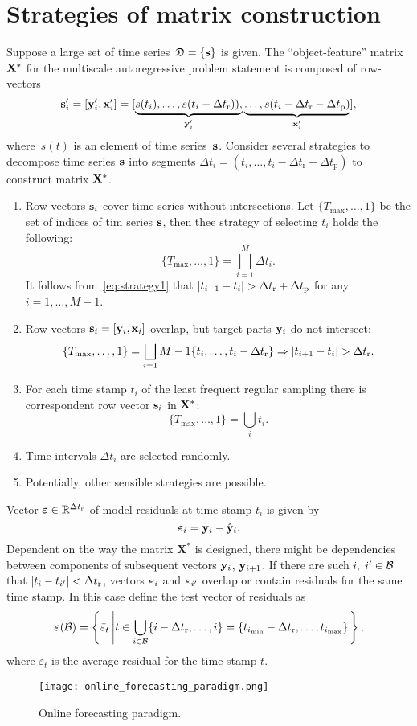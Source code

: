 \documentclass[12pt]{article}
\begin{document}
\section{Strategies of matrix construction}
Suppose a large set of time series~${\mathfrak{D}}=\{{\mathbf{s}}\}$ is given. The ``object-feature'' matrix~${\mathbf{X}}^*$ for the multiscale autoregressive problem statement is composed of row-vectors
\[
{\mathbf{s}}_i^\prime = [{\mathbf{y}}_i^\prime, {\mathbf{x}}_i^\prime] = [\underbrace{s(t_i),\dots,s(t_i-\Delta t_\text{r})),}_{{\mathbf{y}}_i^\prime}
\underbrace{\dots,s(t_i-\Delta t_\text{r}-\Delta t_\text{p})}_{{\mathbf{x}}_i^\prime}],
\]
where~$s(t)$ is an element of time series~${\mathbf{s}}$. Consider several strategies to decompose time series ${\mathbf{s}}$ into segments $\Delta t_i = (t_i,\dots,t_i-\Delta t_\text{r}-\Delta t_\text{p})$ to construct  matrix ${\mathbf{X}}^{*}$.
\begin{enumerate}
\item Row vectors ${\mathbf{s}}_i$ cover time series without intersections. Let $\{T_{\max}, \dots, 1\}$ be the set of indices of tim series ${\mathbf{s}}$, then thee strategy of selecting $t_i$ holds the following:
\begin{equation}\label{eq:strategy1}\{T_{\max}, \dots, 1\} = \bigsqcup_{i=1}^{M} \Delta t_i.\end{equation}
It follows from~\eqref{eq:strategy1} that $|t_{i+1} - t_i| > \Delta t_\text{r} + \Delta t_\text{p}$ for any $i = 1, \dots, M-1$.
\item Row vectors ${\mathbf{s}}_i = [{\mathbf{y}}_i, {\mathbf{x}}_i]$ overlap, but target parts  ${\mathbf{y}}_i$ do not intersect:
    \begin{equation}\label{eq:strategy2}\{T_{\max}, \dots, 1\} = \bigsqcup_{i=1}{M-1} \{t_i,\dots,t_i-\Delta t_\text{r}\} \Rightarrow |t_{i+1} - t_i| > \Delta t_\text{r}. \end{equation}
\item For each time stamp $t_i$ of the least frequent regular sampling there is correspondent row vector ${\mathbf{s}}_i$ in ${\mathbf{X}}^{*}$:
    \[\{T_{\max}, \dots, 1\} = \bigcup_i t_i. \]
\item Time intervals $\Delta t_i$ are selected randomly.
\item Potentially, other sensible strategies are possible.
\end{enumerate}
 Vector ${\boldsymbol{\varepsilon}} \in \mathbb{R}^{\Delta t_\text{r}}$ of model residuals at time stamp $t_i$ is given by
\[{\boldsymbol{\varepsilon}}_i = {{\mathbf{y}}}_i - \hat{{\mathbf{y}}}_i.\]
Dependent on the way the matrix $\mathbf{X}^{*}$ is designed, there might be dependencies between components of subsequent vectors ${\mathbf{y}}_{i}$, ${\mathbf{y}}_{i+1}$.
If there are such $i, \; i' \in {\mathcal{B}}$ that $|t_i - t_{i'}| < \Delta t_\text{r}$, vectors ${\boldsymbol{\varepsilon}}_i$ and ${\boldsymbol{\varepsilon}}_{i'}$ overlap or contain residuals for the same time stamp. In this case define the test vector of residuals as
\[{\boldsymbol{\varepsilon}}({\mathcal{B}}) = \left\{\bar{\varepsilon}_t \left| t \in \bigcup_{i \in {\mathcal{B}}} \{i-\Delta t_\text{r}, \dots, i\} = \{t_{i_{\min}} - \Delta t_\text{r}, \dots, t_{i_{\max}}\}\right.\right\}, \]
where $\bar{\varepsilon}_t$ is the average residual for the time stamp $t$.
\begin{figure}[!ht]
\centering\texttt{[image: online\_forecasting\_paradigm.png]}
\label{fg:online_frc}
\caption{Online forecasting paradigm.}
\end{figure}
\end{document}
